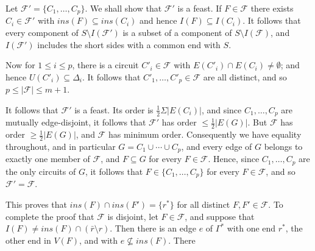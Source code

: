 Let $\mathscr{F}' = \{C_1, \dots, C_p\}$. We shall show that $\mathscr{F}'$ is a feast. If $F \in \mathscr{F}$ there exists $C_i \in \mathscr{F}'$ with $ins(F) \subseteq ins(C_i)$ and hence $I(F) \subseteq I(C_i)$. It follows that every component of $S \setminus I(\mathscr{F}')$ is a subset of a component of $S \setminus I(\mathscr{F})$, and $I(\mathscr{F}')$ includes the short sides with a common end with $S$.

Now for $1 \le i \le p$, there is a circuit $C'_i \in \mathscr{F}$ with $E(C'_i) \cap E(C_i) \ne \emptyset$; and hence $U(C'_i) \subseteq \Delta_i$. It follows that $C'_1, \dots, C'_p \in \mathscr{F}$ are all distinct, and so $p \le |\mathscr{F}| \le m + 1$.

It follows that $\mathscr{F}'$ is a feast. Its order is $\frac{1}{2}\Sigma|E(C_i)|$, and since $C_1, \dots, C_p$ are mutually edge-disjoint, it follows that $\mathscr{F}'$ has order $\le \frac{1}{2}|E(G)|$. But $\mathscr{F}$ has order $\ge \frac{1}{2}|E(G)|$, and $\mathscr{F}$ has minimum order. Consequently we have equality throughout, and in particular $G = C_1 \cup \cdots \cup C_p$, and every edge of $G$ belongs to exactly one member of $\mathscr{F}$, and $F \subseteq G$ for every $F \in \mathscr{F}$. Hence, since $C_1, \dots, C_p$ are the only circuits of $G$, it follows that $F \in \{C_1, \dots, C_p\}$ for every $F \in \mathscr{F}$, and so $\mathscr{F}' = \mathscr{F}$.

This proves that $ins(F) \cap ins(F') = \{r^*\}$ for all distinct $F, F' \in \mathscr{F}$. To complete the proof that $\mathscr{F}$ is disjoint, let $F \in \mathscr{F}$, and suppose that $I(F) \ne ins(F) \cap (\bar{r} \setminus r)$. Then there is an edge $e$ of $\Gamma^*$ with one end $r^*$, the other end in $V(F)$, and with $e \nsubseteq ins(F)$. There
